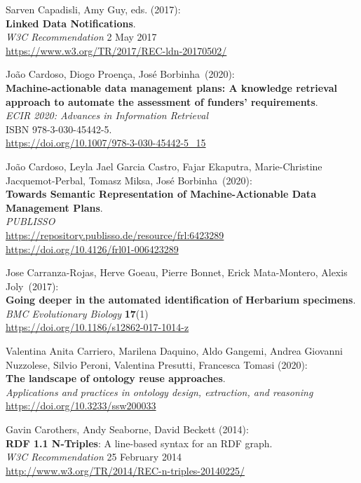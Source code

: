 \begin{thebibliography}{9}
Sarven Capadisli, Amy Guy, eds. (2017): \\
\textbf{Linked Data Notifications}.\\
\emph{W3C Recommendation} 2 May 2017 \\
\url{https://www.w3.org/TR/2017/REC-ldn-20170502/}

João Cardoso, Diogo Proença, José Borbinha~(2020):\\
\textbf{Machine-actionable data management plans: A knowledge retrieval
approach to automate the assessment of funders' requirements}.\\
\emph{ECIR 2020: Advances in Information Retrieval}\\
ISBN 978-3-030-45442-5.\\
\url{https://doi.org/10.1007/978-3-030-45442-5_15}

João Cardoso, Leyla Jael Garcia Castro, Fajar Ekaputra, Marie-Christine Jacquemot-Perbal, Tomasz Miksa, José Borbinha~(2020):\\
\textbf{Towards Semantic Representation of Machine-Actionable Data
Management Plans}.\\
\emph{PUBLISSO}\\
\url{https://repository.publisso.de/resource/frl:6423289}\\
\url{https://doi.org/10.4126/frl01-006423289}

Jose Carranza-Rojas, Herve Goeau, Pierre Bonnet, Erick Mata-Montero, Alexis Joly~(2017):\\
\textbf{Going deeper in the automated identification of Herbarium specimens}.\\
\emph{BMC Evolutionary Biology} \textbf{17}(1)\\
\url{https://doi.org/10.1186/s12862-017-1014-z}

Valentina Anita Carriero, Marilena Daquino, Aldo Gangemi, Andrea
Giovanni Nuzzolese, Silvio Peroni, Valentina Presutti, Francesca
Tomasi (2020): \\
\textbf{The landscape of ontology reuse approaches}. \\
\emph{Applications and practices in ontology design, extraction, and
reasoning} \\
\url{https://doi.org/10.3233/ssw200033}

Gavin Carothers, Andy Seaborne, David Beckett (2014):\\
\textbf{RDF 1.1 N-Triples}: A line-based syntax for an RDF graph.\\
\emph{W3C Recommendation} 25 February 2014\\
\url{http://www.w3.org/TR/2014/REC-n-triples-20140225/}



\end{thebibliography}
